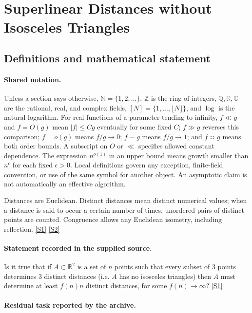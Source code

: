 \documentclass[11pt,a4paper]{article}
\newcommand{\N}{\mathbb{N}}
\newcommand{\Z}{\mathbb{Z}}
\newcommand{\Q}{\mathbb{Q}}
\newcommand{\R}{\mathbb{R}}
\newcommand{\C}{\mathbb{C}}
\newcommand{\sref}[2]{\hyperlink{source:#1:#2}{[S#2]}}
\begin{document}
\section{Superlinear Distances without Isosceles Triangles}\label{statement}


\subsection{Definitions and mathematical statement}

\paragraph{Shared notation.}Unless a section says otherwise, $\N=\{1,2,\ldots\}$,
$\Z$ is the ring of integers, $\Q,\R,\C$ are the rational, real, and complex
fields, $[N]=\{1,\ldots,\lfloor N\rfloor\}$, and $\log$ is the natural
logarithm. For real functions of a parameter tending to infinity,
$f\ll g$ and $f=O(g)$ mean $|f|\leq Cg$ eventually for some fixed $C$;
$f\gg g$ reverses this comparison; $f=o(g)$ means $f/g\to0$;
$f\sim g$ means $f/g\to1$; and $f\asymp g$ means both order bounds.
A subscript on $O$ or $\ll$ specifies allowed constant dependence.
The expression $n^{o(1)}$ in an upper bound means growth smaller than
$n^\epsilon$ for each fixed $\epsilon>0$. Local definitions govern any
exception, finite-field convention, or use of the same symbol for another
object. An asymptotic claim is not automatically an effective algorithm.



Distances are Euclidean. Distinct distances mean distinct numerical values; when a distance is said to occur a certain number of times, unordered pairs of distinct points are counted. Congruence allows any Euclidean isometry, including reflection. \sref{statement}{1} \sref{statement}{2}

\paragraph{Statement recorded in the supplied source.}
Is it true that if $A\subset \mathbb{R}^2$ is a set of $n$ points such that every subset of $3$ points determines $3$ distinct distances (i.e. $A$ has no isosceles triangles) then $A$ must determine at least $f(n)n$ distinct distances, for some $f(n)\to \infty$? \sref{statement}{1}

\paragraph{Residual task reported by the archive.}
\end{document}
